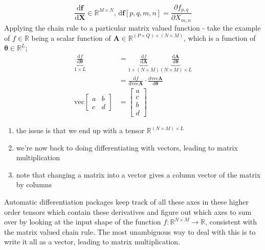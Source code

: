 \documentclass[a4paper, 12pt]{article}
\newcommand{\pdif}[2]{\frac{\partial #1}{\partial #2}}
\newcommand{\dif}[2]{\frac{\mathrm{d}#1}{\mathrm{d}#2}}
\newcommand{\mat}[1]{\boldsymbol{#1}}
\renewcommand{\vec}[1]{\boldsymbol{#1}}
\begin{document}
            $$\dif{\mat{f}}{\mat{X}} \in \mathbb{R}^{M \times N}\text{,\ \ \ \ } \mathrm{d}\mat{f}[p, q, m, n] = \pdif{f_{p, q}}{X_{m, n}}$$
            Applying the chain rule to a particular matrix valued function - take the example of $f \in \mathbb{R}$ being a scalar function of $\mat{A} \in \mathbb{R}^{(P \times Q) \times (N \times M)}$, which is a function of $\vec{\theta} \in \mathbb{R}^L$;
            \setcounter{equation}{0}
            \begin{align}
                \underbrace{\dif{f}{\vec{\theta}}}_{1 \times L} & = \underbrace{\dif{f}{\mat{A}}}_{1 \times (N \times M)} \underbrace{\dif{\mat{A}}{\vec{\theta}}}_{(N \times M) \times L} \\
                & = \dif{f}{\mathrm{vec}\vec{A}} \cdot \dif{\mathrm{vec}\vec{A}}{\vec{\theta}} \\
                \mathrm{vec}\begin{bmatrix}
                    a & b \\
                    c & d
                \end{bmatrix} & = \begin{bmatrix}
                    a \\ c \\ b \\ d
                \end{bmatrix}
            \end{align}
            \begin{enumerate}[(1)]
                \itemsep0em
                \item the issue is that we end up with a tensor $\mathbb{R}^{(N \times M) \times L}$
                \item we're now back to doing differentiating with vectors, leading to matrix multiplication
                \item note that changing a matrix into a vector gives a column vector of the matrix by columns
            \end{enumerate}
            Automatic differentiation packages keep track of all these axes in these higher order tensors which contain these derivatives and figure out which axes to sum over by looking at the input shape of the function $f : \mathbb{R}^{N \times M} \to \mathbb{R}$, consistent with the matrix valued chain rule.
            The most unambiguous way to deal with this is to write it all as a vector, leading to matrix multiplication.
\end{document}
